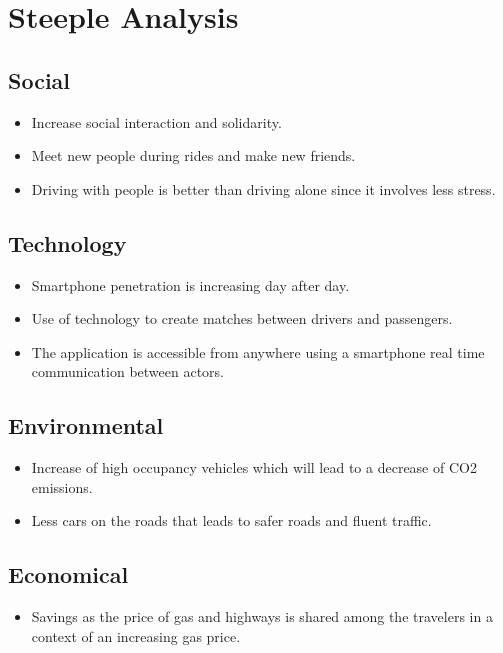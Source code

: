 \chapter{Steeple Analysis} \label{ap:Appendix1}

\section*{Social}
\begin{itemize}
\item Increase social interaction and solidarity.
\item Meet new people during rides and make new friends.
\item Driving with people is better than driving alone since it involves less stress.
\end{itemize}

\section*{Technology}
\begin{itemize}
\item Smartphone penetration is increasing day after day.  
\item Use of technology to create matches between drivers and passengers.
\item The application is accessible from anywhere using a smartphone  real time communication between actors.
\end{itemize}

\section*{Environmental}
\begin{itemize}
\item Increase of high occupancy vehicles which will lead to a decrease of CO2 emissions.
\item Less cars on the roads that leads to safer roads and fluent traffic. 
\end{itemize}

\section*{Economical}
\begin{itemize}
\item Savings as the price of gas and highways is shared among the travelers in a context of an increasing gas price.
\end{itemize}

